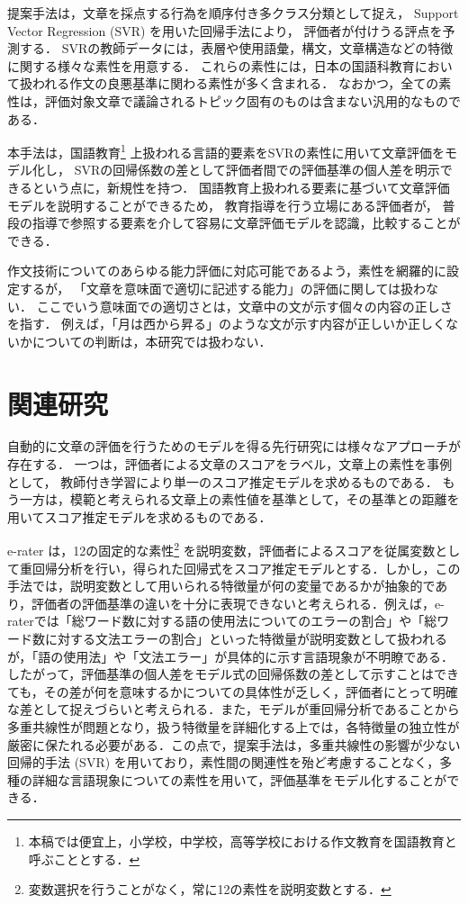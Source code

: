 \documentclass[japanese]{jnlp_1.5}
\begin{document}
提案手法は，文章を採点する行為を順序付き多クラス分類として捉え，
Support Vector Regression (SVR) \cite{SmolaSch1998}を用いた回帰手法により，
評価者が付けうる評点を予測する．
SVRの教師データには，表層や使用語彙，構文，文章構造などの特徴に関する様々な素性を用意する．
これらの素性には，日本の国語科教育において扱われる作文の良悪基準に関わる素性が多く含まれる．
なおかつ，全ての素性は，評価対象文章で議論されるトピック固有のものは含まない汎用的なものである．

本手法は，国語教育\footnote{
	本稿では便宜上，小学校，中学校，高等学校における作文教育を国語教育と呼ぶこととする．}
上扱われる言語的要素をSVRの素性に用いて文章評価をモデル化し，
SVRの回帰係数の差として評価者間での評価基準の個人差を明示できるという点に，新規性を持つ．
国語教育上扱われる要素に基づいて文章評価モデルを説明することができるため，
教育指導を行う立場にある評価者が，
普段の指導で参照する要素を介して容易に文章評価モデルを認識，比較することができる．

作文技術についてのあらゆる能力評価に対応可能であるよう，素性を網羅的に設定するが，
「文章を意味面で適切に記述する能力」の評価に関しては扱わない．
ここでいう意味面での適切さとは，文章中の文が示す個々の内容の正しさを指す．
例えば，「月は西から昇る」のような文が示す内容が正しいか正しくないかについての判断は，本研究では扱わない．



\section{関連研究}

自動的に文章の評価を行うためのモデルを得る先行研究には様々なアプローチが存在する．
一つは，評価者による文章のスコアをラベル，文章上の素性を事例として，
教師付き学習により単一のスコア推定モデルを求めるものである\cite{BursteinEtAl1998,BursteinWolska2003,Elliot2003,Ellis1966,Ellis1994,LandauerLahamFoltz2003a,LandauerLahamFoltz2003b,FoltzLahamLandauer1999,AttaliPowers2008,AttaliBurstein2006}．
もう一方は，模範と考えられる文章上の素性値を基準として，その基準との距離を用いてスコア推定モデルを求めるものである\cite{IshiokaKameda2006,IshiokaKameda2003,Ishioka2008b}．

e-rater \cite{AttaliBurstein2006}は，12の固定的な素性\footnote{
	変数選択を行うことがなく，常に12の素性を説明変数とする．}
を説明変数，評価者によるスコアを従属変数として重回帰分析を行い，得られた回帰式をスコア推定モデルとする．しかし，この手法では，説明変数として用いられる特徴量が何の変量であるかが抽象的であり，評価者の評価基準の違いを十分に表現できないと考えられる．例えば，e-raterでは「総ワード数に対する語の使用法についてのエラーの割合」や「総ワード数に対する文法エラーの割合」といった特徴量が説明変数として扱われるが，「語の使用法」や「文法エラー」が具体的に示す言語現象が不明瞭である．したがって，評価基準の個人差をモデル式の回帰係数の差として示すことはできても，その差が何を意味するかについての具体性が乏しく，評価者にとって明確な差として捉えづらいと考えられる．また，モデルが重回帰分析であることから多重共線性が問題となり，扱う特徴量を詳細化する上では，各特徴量の独立性が厳密に保たれる必要がある．この点で，提案手法は，多重共線性の影響が少ない回帰的手法 (SVR) を用いており，素性間の関連性を殆ど考慮することなく，多種の詳細な言語現象についての素性を用いて，評価基準をモデル化することができる．
\end{document}
